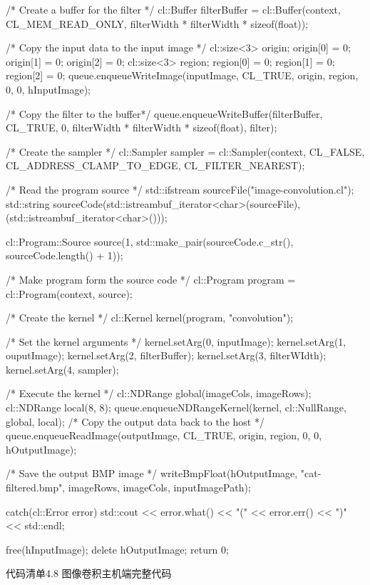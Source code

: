\begin{codebox}[cpp]
{{    /* Create a buffer for the filter */
    cl::Buffer filterBuffer = cl::Buffer(context, CL_MEM_READ_ONLY,
    filterWidth * filterWidth * sizeof(float));

    /* Copy the input data to the input image */
    cl::size<3> origin;
    origin[0] = 0;
    origin[1] = 0;
    origin[2] = 0;
    cl::size<3> region;
    region[0] = 0;
    region[1] = 0;
    region[2] = 0;
    queue.enqueueWriteImage(inputImage, CL_TRUE, origin, region,
    0, 0,
    hInputImage);

    /* Copy the filter to the buffer*/
    queue.enqueueWriteBuffer(filterBuffer, CL_TRUE, 0,
    filterWidth * filterWidth * sizeof(float), filter);

    /* Create the sampler */
    cl::Sampler sampler = cl::Sampler(context, CL_FALSE,
    CL_ADDRESS_CLAMP_TO_EDGE, CL_FILTER_NEAREST);

    /* Read the program source */
    std::ifstream sourceFile("image-convolution.cl");
    std::string sourceCode(std::istreambuf_iterator<char>(sourceFile),
    (std::istreambuf_iterator<char>()));

    cl::Program::Source source(1,
      std::make_pair(sourceCode.c_str(),
      sourceCode.length() + 1));

    /* Make program form the source code */
    cl::Program program = cl::Program(context, source);

    /* Create the kernel */
    cl::Kernel kernel(program, "convolution");

    /* Set the kernel arguments */
    kernel.setArg(0, inputImage);
    kernel.setArg(1, ouputImage);
    kernel.setArg(2, filterBuffer);
    kernel.setArg(3, filterWIdth);
    kernel.setArg(4, sampler);

    /* Execute the kernel */
    cl::NDRange global(imageCols, imageRows);
    cl::NDRange local(8, 8);
    queue.enqueueNDRangeKernel(kernel, cl::NullRange, global,
    local);
    /* Copy the output data back to the host */
    queue.enqueueReadImage(outputImage, CL_TRUE, origin, region,
    0, 0,
    hOutputImage);

    /* Save the output BMP image */
    writeBmpFloat(hOutputImage, "cat-filtered.bmp", imageRows, imageCols, inputImagePath);
  }
  catch(cl::Error error){
    std::cout << error.what() << "(" << error.err() << ")" << std::endl;
  }

  free(hInputImage);
  delete hOutputImage;
  return 0;
}
\end{codebox}

代码清单4.8 图像卷积主机端完整代码



